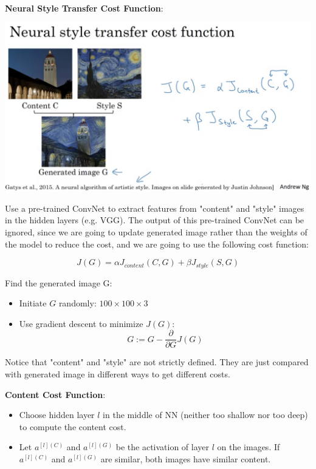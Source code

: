 \documentclass{article}
\begin{document}
\noindent \textbf{Neural Style Transfer Cost Function}:

\begin{center}
\includegraphics[scale=0.4]{./images/neural_style_transfer_cost.png}
\end{center}

\noindent Use a pre-trained ConvNet to extract features from "content" and "style" images in the hidden layers (e.g. VGG). The output of this pre-trained ConvNet can be ignored, since we are going to update generated image rather than the weights of the model to reduce the cost, and we are going to use the following cost function:

\[J(G) = \alpha J_{content}(C, G) + \beta J_{style}(S, G)\]

\noindent Find the generated image G:

\begin{itemize}
    \item Initiate \(G\) randomly: \(100 \times 100 \times 3\)
    \item Use gradient descent to minimize \(J(G)\): \[G := G - \frac{\partial}{\partial G} J(G)\]
\end{itemize}

\noindent Notice that "content" and "style" are not strictly defined. They are just compared with generated image in different ways to get different costs.

\bigskip

\noindent \textbf{Content Cost Function}:

\begin{itemize}
    \item Choose hidden layer \(l\) in the middle of NN (neither too shallow nor too deep) to compute the content cost.
    \item Let \(a^{[l](C)}\) and \(a^{[l](G)}\) be the activation of layer \(l\) on the images. If \(a^{[l](C)}\) and \(a^{[l](G)}\) are similar, both images have similar content.
\end{itemize}
\end{document}
